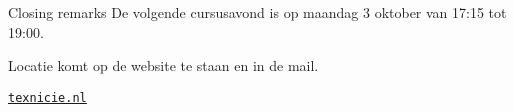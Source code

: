 \begin{frame}{Closing remarks}
De volgende cursusavond is op maandag 3 oktober van 17:15 tot 19:00.

Locatie komt op de website te staan en in de mail.

\bigskip

\leavevmode\bigskip

\begin{center}
    \centering \LARGE\href{https://texnicie.nl}{\ul{\texttt{texnicie.nl}}}
\end{center}

\end{frame}
